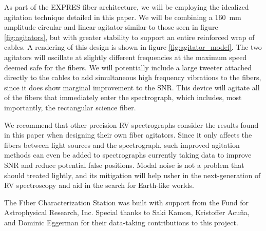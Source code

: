 \documentclass[twocolumn]{emulateapj}
\begin{document}
As part of the EXPRES fiber architecture, we will be employing the idealized agitation technique detailed in this paper. We will be combining a \SI{160}{\milli\meter} amplitude circular and linear agitator similar to those seen in figure \ref{fig:agitators}, but with greater stability to support an entire reinforced wrap of cables. A rendering of this design is shown in figure \ref{fig:agitator_model}. The two agitators will oscillate at slightly different frequencies at the maximum speed deemed safe for the fibers. We will potentially include a large tweeter attached directly to the cables to add simultaneous high frequency vibrations to the fibers, since it does show marginal improvement to the SNR. This device will agitate all of the fibers that immediately enter the spectrograph, which includes, most importantly, the rectangular science fiber.

We recommend that other precision RV spectrographs consider the results found in this paper when designing their own fiber agitators. Since it only affects the fibers between light sources and the spectrograph, such improved agitation methods can even be added to spectrographs currently taking data to improve SNR and reduce potential false positions. Modal noise is not a problem that should treated lightly, and its mitigation will help usher in the next-generation of RV spectroscopy and aid in the search for Earth-like worlds.

\acknowledgments

The Fiber Characterization Station was built with support from the Fund for Astrophysical Research, Inc. Special thanks to Saki Kamon, Kristoffer Acu\~na, and Dominic Eggerman for their data-taking contributions to this project.

\end{document}
